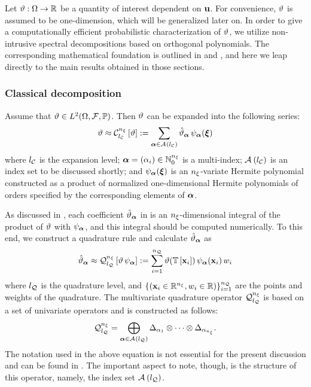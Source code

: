 Let $\vartheta: \Omega \to \mathbb{R}$ be a quantity of interest dependent on $\mathbf{u}$.
For convenience, $\vartheta$ is assumed to be one-dimension, which will be generalized later on.
In order to give a computationally efficient probabilistic characterization of $\vartheta$, we utilize non-intrusive spectral decompositions based on orthogonal polynomials.
The corresponding mathematical foundation is outlined in  and , and here we leap directly to the main results obtained in those sections.

\subsubsection{Classical decomposition}
Assume that $\vartheta \in L^{2}(\Omega, \mathcal{F}, \mathbb{P})$.
Then $\vartheta$ can be expanded into the following series:
\begin{equation} \elab{spectral-decomposition}
  \w \approx \chaos{\nvars}{\nclevel}{\w} := \sum_{\multiindex \in \chaosMultiindexSet{\nclevel}} \coefficient{\w}_{\multiindex} \, \polynomial_{\multiindex}(\vz)
\end{equation}
where ${l_\mathcal{C}}$ is the expansion level; $\bm{\alpha} = (\alpha_i) \in \mathbb{N}_{0}^{n_\xi}$ is a multi-index; $\mathcal{A}_{}\left( {l_\mathcal{C}} \right)$ is an index set to be discussed shortly; and $\psi_{\bm{\alpha}}(\bm{\xi})$ is an ${n_\xi}$-variate Hermite polynomial constructed as a product of normalized one-dimensional Hermite polynomials of orders specified by the corresponding elements of $\bm{\alpha}$.

As discussed in , each coefficient $\hat{\vartheta}_{\bm{\alpha}}$ in  is an ${n_\xi}$-dimensional integral of the product of $\vartheta$ with $\psi_{\bm{\alpha}}$, and this integral should be computed numerically.
To this end, we construct a quadrature rule and calculate $\hat{\vartheta}_{\bm{\alpha}}$ as
\begin{equation} \elab{numerical-integration}
  \coefficient{\w}_{\multiindex} \approx \quadrature{\nvars}{\nqlevel}{\w \, \polynomial_{\multiindex}} := \sum_{i = 1}^\nqorder \w(\transformation{\point_i}) \, \polynomial_{\multiindex}(\point_i) \, \weight_i
\end{equation}
where ${l_\mathcal{Q}}$ is the quadrature level, and $\{ (\mathbf{x}_i \in \mathbb{R}^{n_\xi}, w_i \in \mathbb{R}) \}_{i = 1}^{n_\mathcal{Q}}$ are the points and weights of the quadrature.
The multivariate quadrature operator $\quadrature$ is based on a set of univariate operators and is constructed as follows:
\begin{equation} \elab{smolyak-sparse-grid}
  \quadrature = \bigoplus_{\multiindex \in \quadratureMultiindexSet{\nqlevel}} \Delta_{\alpha_1} \otimes \cdots \otimes \Delta_{\alpha_\nvars}.
\end{equation}
The notation used in the above equation is not essential for the present discussion and can be found in .
The important aspect to note, though, is the structure of this operator, namely, the index set $\mathcal{A}_{}\left( {l_\mathcal{Q}} \right)$.

